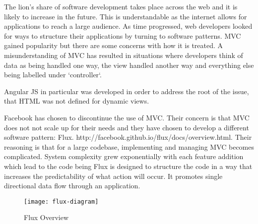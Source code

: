 The lion's share of software development takes place across the web and it is likely to increase in the future. This is understandable
as the internet allows for applications to reach a large audience. As time progressed, web developers looked for ways to structure their
applications by turning to software patterns. MVC gained popularity but there are some concerns with how it is treated. A misunderstanding of
MVC has resulted in situations where developers think of data as being handled one way, the view handled another way and everything else being labelled
under `controller`.\par


Angular JS in particular was developed in order to address the root of the issue, that HTML was not defined for dynamic views.\par
{}\par

Facebook has chosen to discontinue the use of MVC. Their concern is that MVC does not not scale up for their needs and they have chosen to
develop a different software pattern: Flux. http://facebook.github.io/flux/docs/overview.html. Their reasoning is that for a large codebase, implementing
and managing MVC becomes complicated. System complexity grew exponentially with each feature addition which lead to the code being 
Flux is designed to structure the code in a way that increases the predictability of what action will occur. It promotes single directional data flow
through an application. \par

\begin{figure}
  \texttt{[image: flux-diagram]}
  \caption{Flux Overview}
\end{figure}

